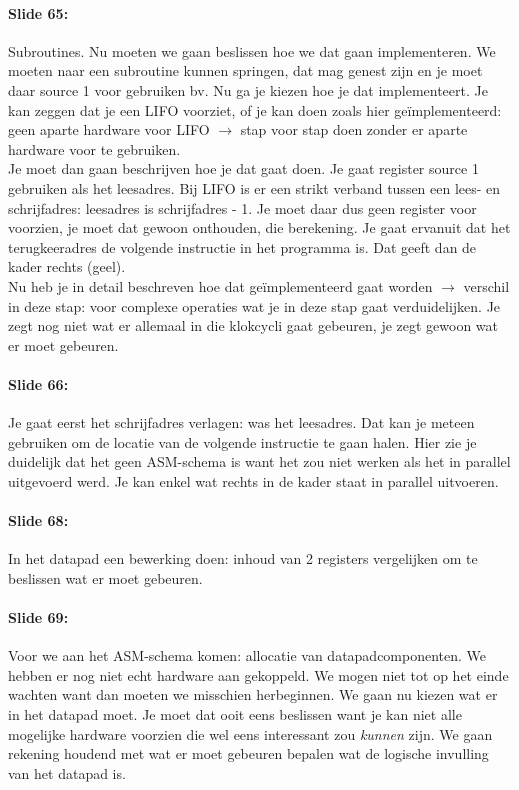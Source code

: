 \documentclass[10pt,a4paper]{book}
\begin{document}
\paragraph{Slide 65:} Subroutines. Nu moeten we gaan beslissen hoe we dat gaan implementeren. We moeten naar een subroutine kunnen springen, dat mag genest zijn en je moet daar source 1 voor gebruiken bv. Nu ga je kiezen hoe je dat implementeert. Je kan zeggen dat je een LIFO voorziet, of je kan doen zoals hier ge\"implementeerd: geen aparte hardware voor LIFO $\rightarrow$ stap voor stap doen zonder er aparte hardware voor te gebruiken.\\
Je moet dan gaan beschrijven hoe je dat gaat doen. Je gaat register source 1 gebruiken als het leesadres. Bij LIFO is er een strikt verband tussen een lees- en schrijfadres: leesadres is schrijfadres - 1. Je moet daar dus geen register voor voorzien, je moet dat gewoon onthouden, die berekening. Je gaat ervanuit dat het terugkeeradres de volgende instructie in het programma is. Dat geeft dan de kader rechts (geel).\\
Nu heb je in detail beschreven hoe dat ge\"implementeerd gaat worden $\rightarrow$ verschil in deze stap: voor complexe operaties wat je in deze stap gaat verduidelijken. Je zegt nog niet wat er allemaal in die klokcycli gaat gebeuren, je zegt gewoon wat er moet gebeuren.

\paragraph{Slide 66:} Je gaat eerst het schrijfadres verlagen: was het leesadres. Dat kan je meteen gebruiken om de locatie van de volgende instructie te gaan halen. Hier zie je duidelijk dat het geen ASM-schema is want het zou niet werken als het in parallel uitgevoerd werd.  Je kan enkel wat rechts in de kader staat in parallel uitvoeren.

\paragraph{Slide 68:} In het datapad een bewerking doen: inhoud van 2 registers vergelijken om te beslissen wat er moet gebeuren.

\paragraph{Slide 69:} Voor we aan het ASM-schema komen: allocatie van datapadcomponenten. We hebben er nog niet echt hardware aan gekoppeld. We mogen niet tot op het einde wachten want dan moeten we misschien herbeginnen. We gaan nu kiezen wat er in het datapad moet. Je moet dat ooit eens beslissen want je kan niet alle mogelijke hardware voorzien die wel eens interessant zou \emph{kunnen} zijn. We gaan rekening houdend met wat er moet gebeuren bepalen wat de logische invulling van het datapad is.
\end{document}
